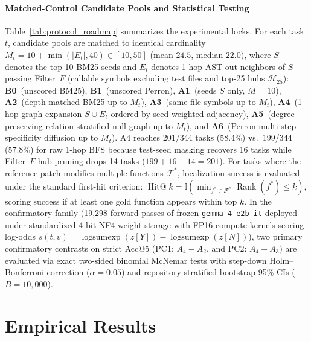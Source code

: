 \documentclass[10pt]{article}
\begin{document}
\paragraph{Matched-Control Candidate Pools and Statistical Testing}
Table~\ref{tab:protocol_roadmap} summarizes the experimental locks. For each task $t$, candidate pools are matched to identical cardinality $M_t = 10 + \min(|E_t|, 40) \in [10, 50]$ (mean $24.5$, median $22.0$), where $S$ denotes the top-10 BM25 seeds and $E_t$ denotes 1-hop AST out-neighbors of $S$ passing Filter~$F$ (callable symbols excluding test files and top-25 hubs $\mathcal{H}_{25}$): \textbf{B0}~(unscored BM25), \textbf{B1}~(unscored Perron), \textbf{A1}~(seeds $S$ only, $M=10$), \textbf{A2}~(depth-matched BM25 up to $M_t$), \textbf{A3}~(same-file symbols up to $M_t$), \textbf{A4}~(1-hop graph expansion $S \cup E_t$ ordered by seed-weighted adjacency), \textbf{A5}~(degree-preserving relation-stratified null graph up to $M_t$), and \textbf{A6}~(Perron multi-step specificity diffusion up to $M_t$). A4 reaches 201/344 tasks (58.4\%) vs.\ 199/344 (57.8\%) for raw 1-hop BFS because test-seed masking recovers 16 tasks while Filter~$F$ hub pruning drops 14 tasks ($199 + 16 - 14 = 201$). For tasks where the reference patch modifies multiple functions $\mathcal{F}^*$, localization success is evaluated under the standard first-hit criterion: $\operatorname{Hit@}k = \mathbb{I}\left(\min_{f^* \in \mathcal{F}^*} \operatorname{Rank}(f^*) \le k\right)$, scoring success if at least one gold function appears within top $k$. In the confirmatory family (19,298 forward passes of frozen \texttt{gemma-4-e2b-it} deployed under standardized 4-bit NF4 weight storage with FP16 compute kernels scoring log-odds $s(t,v) = \operatorname{logsumexp}(z[Y]) - \operatorname{logsumexp}(z[N])$), two primary confirmatory contrasts on strict Acc@5 (PC1: $A_4 - A_2$, and PC2: $A_4 - A_3$) are evaluated via exact two-sided binomial McNemar tests with step-down Holm--Bonferroni correction ($\alpha=0.05$) and repository-stratified bootstrap 95\% CIs ($B=10{,}000$).
\section{Empirical Results}
\label{sec:results}
\end{document}
